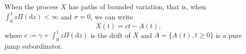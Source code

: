 \documentclass[12pt,reqno]{amsart}
\newcommand{\red}{\textcolor[rgb]{1.00,0.00,0.00}}
\newcommand{\green}{\textcolor[rgb]{0.00,0.70,.30}}
\theoremstyle{definition}
\theoremstyle{remark}
\newcommand{\e}{\mathbb{E}}
\newcommand{\ind}{\mathbf{1}}
\newcommand{\drift}{c}
\begin{document}
When the process $X$  has paths of bounded variation, that is, when $\int^{1}_0 z \Pi(\mathrm{d}z)<\infty$ and $\sigma=0$, we can write
$$
X(t) = \drift t - A(t) ,
$$
where $\drift := \gamma+\int^{1}_0 z \Pi(\mathrm{d}z) $ is the drift of $X$ and $A=\{{ A(t)},t\geq 0\}$ is a pure jump subordinator.

\end{document}
